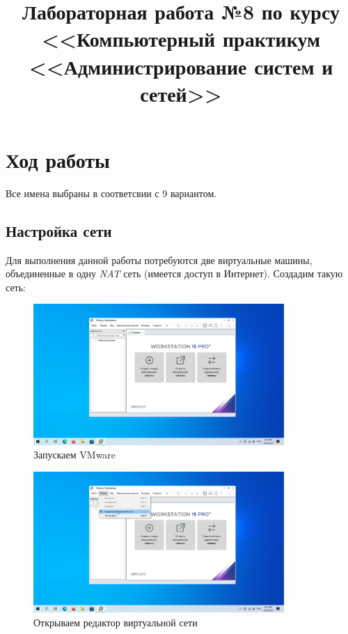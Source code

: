 \documentclass[a4paper]{article}
\title{
  Лабораторная работа №8 по курсу \\
  <<Компьютерный практикум <<Администрирование систем и сетей>>  
}
\begin{document}
  \templatedtitlepage
  
  \toc
  \section{Ход работы}

  Все имена выбраны в соответсвии с 9 вариантом.

  \subsection{Настройка сети}

  Для выполнения данной работы потребуются две виртуальные машины,
  объединенные в одну \textit{NAT} сеть (имеется доступ в Интернет).
  Создадим такую сеть:

  \begin{figure}[H]
    \centering
    \includegraphics[width=0.85\textwidth]{Screenshot_1}
    \caption{Запускаем VMware}
    \label{img:1}
  \end{figure}

  \begin{figure}[H]
    \centering
    \includegraphics[width=0.85\textwidth]{Screenshot_2}
    \caption{Открываем редактор виртуальной сети}
    \label{img:2}
  \end{figure}
\end{document}
